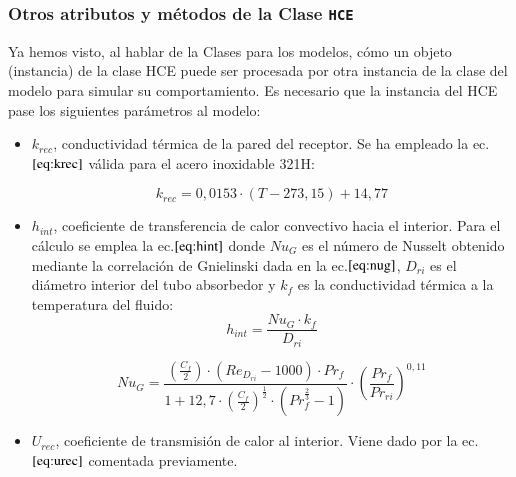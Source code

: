 \subsubsection{Otros atributos y métodos de la Clase \texttt{HCE}}

Ya hemos visto, al hablar de la Clases para los modelos, cómo un objeto (instancia) de la clase HCE puede ser procesada por otra instancia de la clase del modelo para simular su comportamiento. Es necesario que la instancia del HCE pase los siguientes parámetros al modelo:

\begin{itemize}
\item
  \(k_{rec}\), conductividad térmica de la pared del receptor. Se ha  empleado la ec.\(\eqref{eq:krec}\) válida para el acero inoxidable
  321H:

\begin{equation}
    k_{rec} = 0,0153 \cdot (T - 273,15) + 14,77
    \label{eq:krec}
\end{equation}
\end{itemize}

\begin{itemize}
\item
  \(h_{int}\), coeficiente de transferencia de calor convectivo hacia el   interior. Para el cálculo se emplea la ec.\(\eqref{eq:hint}\) donde   \(Nu_{G}\) es el número de Nusselt obtenido mediante la correlación de   Gnielinski dada en la ec.\(\eqref{eq:nug}\), \(D_{ri}\) es el diámetro   interior del tubo absorbedor y \(k_f\) es la conductividad térmica a   la temperatura del fluido: 
\begin{equation}
    h_{int} = \frac{Nu_{G}\cdot k_f }{D_{ri}}
    \label{eq:hint}
\end{equation}

\begin{equation}
    Nu_{G} = \frac{ \left( \frac{C_f}{2} \right)\cdot\left( Re_{D_{ri}} - 1000 \right)\cdot Pr_f }{1 + 12,7 \cdot \left(\frac{C_f}{2} \right)^{\frac{1}{2}}\cdot \left(Pr^{\frac{2}{3}}_f -1 \right)} \cdot \left( \frac{Pr_f}{Pr_{ri}} \right)^{0,11}
    \label{eq:nug}
\end{equation}

\item
  \(U_{rec}\), coeficiente de transmisión de calor al interior. Viene   dado por la ec.\(\eqref{eq:urec}\) comentada previamente. 
\end{itemize}


